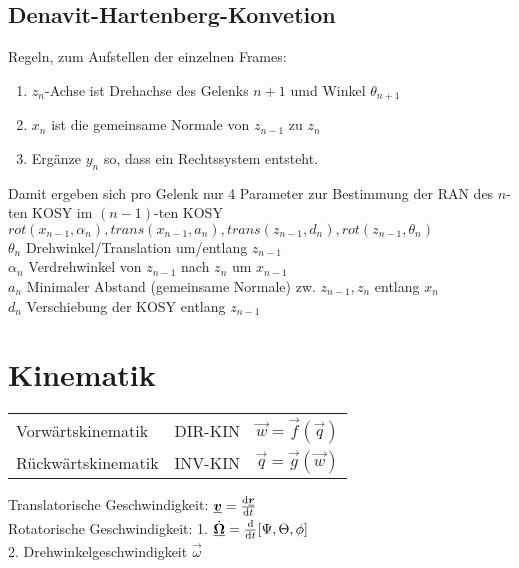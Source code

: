 \documentclass[6pt,a4paper]{scrartcl}
\begin{document}
\begin{multicols}{4}
\subsection{Denavit-Hartenberg-Konvetion}
Regeln, zum Aufstellen der einzelnen Frames:
\begin{enumerate}
	\item $z_n$-Achse ist Drehachse des Gelenks $n+1$ umd Winkel $\theta_{n+1}$
	\item $x_n$ ist die gemeinsame Normale von $z_{n-1}$ zu $z_n$
	\item Ergänze $y_n$ so, dass ein Rechtssystem entsteht. 
\end{enumerate}
Damit ergeben sich pro Gelenk nur 4 Parameter zur Bestimmung der RAN des $n$-ten KOSY im $(n-1)$-ten KOSY\\
$rot(x_{n-1},\alpha_n), trans(x_{n-1},a_n), trans(z_{n-1},d_n), rot(z_{n-1},\theta_n)$\\
$\theta_n$ Drehwinkel/Translation um/entlang $z_{n-1}$\\
$\alpha_n$ Verdrehwinkel von $z_{n-1}$ nach $z_n$ um $x_{n-1}$\\
$a_n$ Minimaler Abstand (gemeinsame Normale) zw. $z_{n-1},z_n$ entlang $x_n$\\
$d_n$ Verschiebung der KOSY entlang $z_{n-1}$\\ 

\section{Kinematik}
\begin{tabular}{lll}
Vorwärtskinematik & DIR-KIN & $\vec w = \vec f(\vec q)$\\
Rückwärtskinematik & INV-KIN & $\vec q = \vec g(\vec w)$\\
\end{tabular}



Translatorische Geschwindigkeit: $\vec v = \frac{\diff \vec r}{\diff t}$\\
Rotatorische Geschwindigkeit: 1. $\dot {\vec \Omega} = \frac{\diff }{\diff t} [\Psi, \Theta, \phi]$\\
2. Drehwinkelgeschwindigkeit $\vec \omega$\\


\end{multicols}
\end{document}
